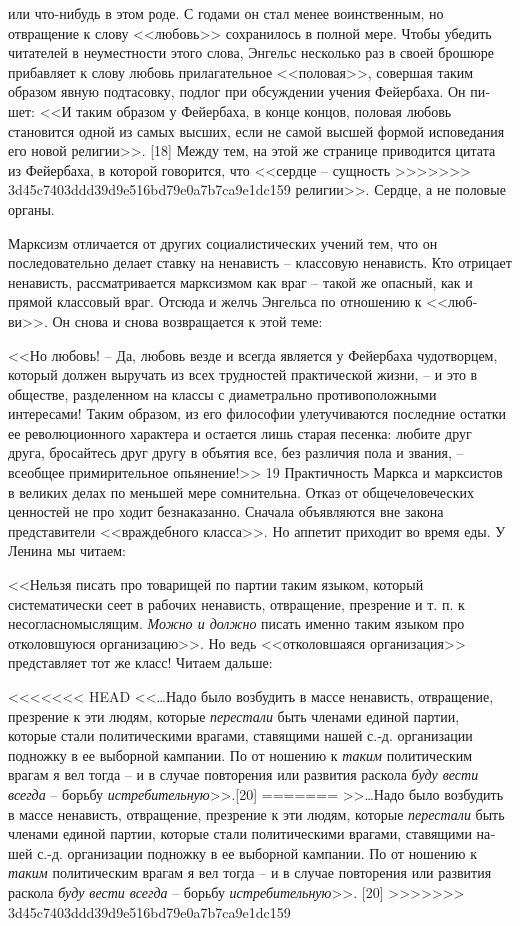 \documentclass{book}
\begin{document}
или что-нибудь в этом роде. С годами он стал менее воинственным, но отвращение к слову <<любовь>> сохранилось в полной мере. Чтобы 
убедить читателей в неуместности этого слова, Энгельс несколько раз в своей брошюре прибавляет к слову любовь прилагательное 
<<половая>>, совершая таким образом явную подтасовку, подлог при обсуждении учения Фейербаха. Он пи­шет: <<И таким образом у 
Фейербаха, в конце концов, половая любовь становится одной из самых высших, если не самой выс­шей формой исповедания его новой 
религии>>. [18] Между тем, на этой же странице приводится цитата из Фейербаха, в кото­рой говорится, что <<сердце -- сущность 
>>>>>>> 3d45c7403ddd39d9e516bd79e0a7b7ca9e1dc159
религии>>. Сердце, а не половые органы.

Марксизм отличается от других социалистических учений тем, что он последовательно делает ставку на ненависть -- клас­совую 
ненависть. Кто отрицает ненависть, рассматривается марксизмом как враг -- такой же опасный, как и прямой классовый враг. Отсюда 
и желчь Энгельса по отношению к <<люб­ви>>. Он снова и снова возвращается к этой теме:

<<Но любовь! -- Да, любовь везде и всегда является у Фейер­баха чудотворцем, который должен выручать из всех трудно­стей 
практической жизни, -- и это в обществе, разделенном на классы с диаметрально противоположными интересами! Та­ким образом, из его 
философии улетучиваются последние остат­ки ее революционного характера и остается лишь старая песен­ка: любите друг друга, 
бросайтесь друг другу в объятия все, без различия пола и звания, -- всеобщее примирительное опьянение!>> 19
Практичность Маркса и марксистов в великих делах по меньшей мере сомнительна. Отказ от общечеловеческих ценно­стей не про ходит 
безнаказанно. Сначала объявляются вне закона представители <<враждебного класса>>. Но аппетит приходит во время еды. У Ленина мы 
читаем:

<<Нельзя писать про товарищей по партии таким языком, ко­торый систематически сеет в рабочих ненависть, отвращение, презрение и т. 
п. к несогласномыслящим. \textit{Можно  и должно}  пи­сать именно таким языком про отколовшуюся организацию>>.
Но ведь <<отколовшаяся организация>> представляет тот же класс! Читаем дальше:

<<<<<<< HEAD
<<\ldots Надо было возбудить в массе ненависть, отвращение, презрение к эти людям, которые \textit{перестали}  быть членами 
единой партии, которые стали политическими врагами, ставящими на­шей с.‑д. организации подножку в ее выборной кампании. По от­
ношению к \textit{таким}  политическим врагам я вел тогда -- и в случае повторения или развития раскола \textit{буду вести 
всегда} --  борьбу \textit{истребительную}>>.[20]
=======
>>\ldots Надо было возбудить в массе ненависть, отвращение, презрение к эти людям, которые \textit{перестали}  быть членами 
единой партии, которые стали политическими врагами, ставящими на­шей с.-д. организации подножку в ее выборной кампании. По от­
ношению к \textit{таким}  политическим врагам я вел тогда -- и в случае повторения или развития раскола \textit{буду вести 
всегда} --  борьбу \textit{истребительную}>>. [20]
>>>>>>> 3d45c7403ddd39d9e516bd79e0a7b7ca9e1dc159
\end{document}
